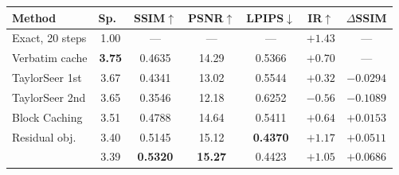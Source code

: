 \begin{tabular}{@{}lcccccc@{}}
\toprule
Method & Sp.\ & SSIM$\uparrow$ & PSNR$\uparrow$ & LPIPS$\downarrow$ & IR$\uparrow$ & $\Delta$SSIM \\
\midrule
Exact, 20 steps & 1.00 & --- & --- & --- & $+1.43$ & --- \\
Verbatim cache & \textbf{3.75} & 0.4635 & 14.29 & 0.5366 & $+0.70$ & --- \\
TaylorSeer 1st & 3.67 & 0.4341 & 13.02 & 0.5544 & $+0.32$ & $-0.0294$ \\
TaylorSeer 2nd & 3.65 & 0.3546 & 12.18 & 0.6252 & $-0.56$ & $-0.1089$ \\
Block Caching & 3.51 & 0.4788 & 14.64 & 0.5411 & $+0.64$ & $+0.0153$ \\
Residual obj. & 3.40 & 0.5145 & 15.12 & \textbf{0.4370} & $\mathbf{+1.17}$ & $+0.0511$ \\
\textbf{\ourmethod{}} & 3.39 & \textbf{0.5320} & \textbf{15.27} & 0.4423 & $+1.05$ & $\mathbf{+0.0686}$ \\
\bottomrule
\end{tabular}
